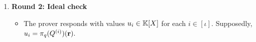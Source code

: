 \documentclass[11pt,letterpaper,usenames,dvipsnames]{article}
\begin{document}
\begin{construction}
\begin{enumerate}[leftmargin=*]
\begin{itemize}[leftmargin=*]
The claim \eqref{e:iop_ideal_eq} is replaced by
%
\begin{equation}\label{e:projected_Q_claim}
   \pi_q(Q^{(i)}(\zz)) \in \pi_q(\ideal_i) \qquad  \text{ for all } \zz\in \bits^{n'}, \ i \in [\iota].
\end{equation}
Recall (cf.\ \cref{d:projections}) that $\pi_q$ is coefficient-wise reduction modulo $q$ when $\ring=\ZZ$, and it is the identity map when $\ring$ is a field $\FF$ of characteristic $q$.
\item The verifier samples and sends a random point $\rr\in \KK^{n'}$.
\end{itemize}
\item \textbf{Round 2: Ideal check}
\begin{itemize}[leftmargin=*]
\item The prover responds with values $u_i\in \mathbb{K}[X]$ for each $i\in [\iota]$. Supposedly, 
%
$
u_i = \pi_q(Q^{(i)})(\mathbf{r}).
$


\end{itemize}
\end{enumerate}
\end{construction}
\end{document}
